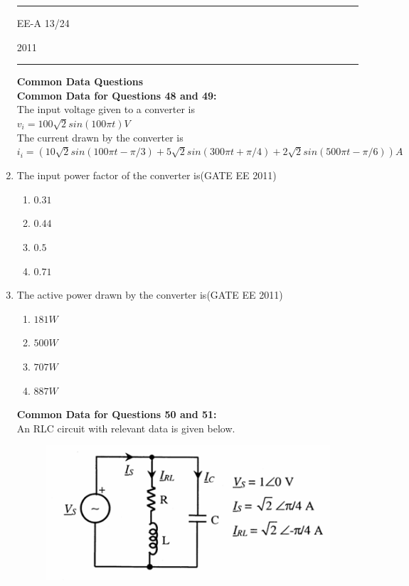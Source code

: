 \documentclass[a4paper,10pt]{exam}
\theoremstyle{remark}
\begin{document}
\begin{enumerate}
\vfill
\noindent\rule{\textwidth}{0.4pt}
\raggedright{EE-A}
\hfill
13/24
\newpage
\raggedright{2011}
\hfill
{}\\

\noindent\rule{\textwidth}{0.4pt}
\raggedright{\textbf{Common Data Questions}}\\
\vspace{0.5cm}
\textbf{Common Data for  Questions 48 and 49:}\\
\vspace{0.1cm}
The input voltage given to a converter is \\
\hspace{3cm} $v_{i}= 100\sqrt{2}sin(100\pi t)  V$\\
\vspace{0.1cm}
The current drawn by the converter is \\
\hspace{3cm} $i_{i}= (10\sqrt{2}sin(100\pi t- \pi/3)+5\sqrt{2}sin(300\pi t+ \pi/4)+2\sqrt{2}sin(500\pi t- \pi/6))A $
\vspace{0.1cm}
\item \quad The input power factor of the converter is\hfill{(GATE EE 2011)}
\begin{multicols}{4}
\begin{enumerate}
\item $0.31$
\item $0.44$
\item $0.5$
\item $0.71$
\end{enumerate}
\end{multicols}
\item \quad The active power drawn by the converter is\hfill{(GATE EE 2011)}
\begin{multicols}{4}
\begin{enumerate}
\item $181 W$
\item $500 W$
\item $707 W$
\item $887 W$
\end{enumerate}
\end{multicols}
\textbf{Common Data for  Questions 50 and 51:}\\
An RLC circuit with relevant data is given below.
\begin{figure}[H]
    \centering
    \includegraphics[width=0.8\columnwidth]{figs/Q 50,51.png}\caption{}     \label{fig:myfigure}

\end{figure}
\end{enumerate}
\end{document}
